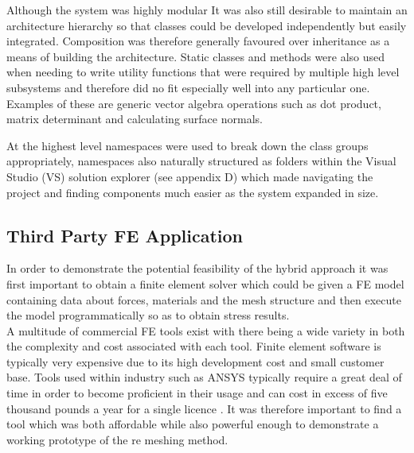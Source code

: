 \noindent
Although the system was highly modular It was also still desirable to maintain an architecture hierarchy so that classes could be developed independently but easily integrated. Composition was therefore generally favoured over inheritance as a means of building the architecture. Static classes and methods were also used when needing to write utility functions that were required by multiple high level subsystems and therefore did no fit especially well into any particular one. Examples of these are generic vector algebra operations such as dot product, matrix determinant and calculating surface normals.

\noindent
At the highest level namespaces were used to break down the class groups appropriately, namespaces also naturally structured as folders within the Visual Studio (VS) solution explorer (see appendix D) which made navigating the project and finding components much easier as the system expanded in size.

\subsection{Third Party FE Application}
In order to demonstrate the potential feasibility of the hybrid approach it was first important to obtain a finite element solver which could be given a FE model containing data about forces, materials and the mesh structure and then execute the model programmatically so as to obtain stress results. \\ 

\noindent
A multitude of commercial FE tools exist with there being a wide variety in both the complexity and cost associated with each tool. 
Finite element software is typically very expensive due to its high development cost and small customer base. Tools used within industry such as ANSYS typically require a great deal of time in order to become proficient in their usage and can cost in excess of five thousand pounds a year for a single licence \cite{AnsysCost}. It was therefore important to find a tool which was both affordable while also powerful enough to demonstrate a working prototype of the re meshing method.
 
